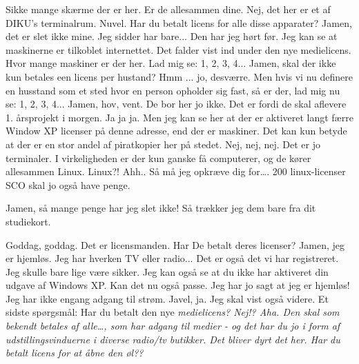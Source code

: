 \documentclass[a4paper,11pt]{article}
\begin{document}
\begin{sketch}
 
          Sikke mange skærme der er her. Er de allesammen dine.
 Nej, det her er et af DIKU's terminalrum.
 Nuvel. 
          Har du betalt licens for alle disse apparater?
 Jamen, det er slet ikke mine. Jeg sidder har bare...
 Den har jeg hørt før. Jeg kan se at maskinerne er tilkoblet
          internettet. Det falder vist ind under den nye medielicens.
          Hvor mange maskiner er der her. Lad mig se: 1, 2, 3, 4...
 Jamen, skal der ikke kun betales een licens per hustand?
 Hmm ... jo, desværre. Men hvis vi nu definere en husstand
		  som et sted hvor en person opholder sig fast, så er der, lad
		  mig nu se: 1, 2, 3, 4... 
 Jamen, hov, vent. De bor her jo ikke. Det er fordi de skal
          aflevere 1. årsprojekt i morgen.
 Ja ja ja. Men jeg kan se her at der
          er aktiveret langt færre Window XP licenser på denne
          adresse, end der er maskiner. Det kan kun betyde at der er
          en stor andel af piratkopier her på stedet.
 Nej, nej, nej. Det er jo terminaler. I virkeligheden er der
          kun ganske få computerer, og de kører allesammen Linux.
 Linux?! Ahh.. Så må jeg opkræve dig for\ldots. 200 linux-licenser 
    SCO skal jo også have penge.

 Jamen, så mange penge har jeg slet ikke!
 Så trækker jeg dem bare fra dit studiekort.


 
          Goddag, goddag. Det er licensmanden. Har De betalt deres
          licenser?
 Jamen, jeg er hjemløs. Jeg har hverken TV eller radio...
 Det er også det vi har registreret. Jeg skulle bare lige
          være sikker. Jeg kan også se at du ikke har aktiveret din
          udgave af Windows XP. Kan det nu også passe.
 Jeg har jo sagt at jeg er hjemløs! Jeg har ikke engang
          adgang til strøm.
 Javel, ja. Jeg skal vist også videre. Et sidste spørgsmål:
          Har du betalt den nye \em{medielicens}?
 Nej!?
 Aha. Den skal som bekendt betales af \emph{alle}\ldots, som har adgang til
          medier - og det har du jo i form af udstillingsvinduerne i
          diverse radio/tv butikker. Det bliver dyrt det her.
 
 Har du betalt licens for at åbne den øl??


\end{sketch}
\end{document}
